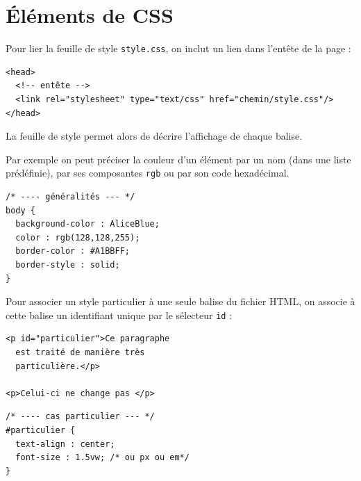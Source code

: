 \section{Éléments de CSS}


Pour lier la feuille de style \texttt{style.css}, on inclut un lien dans l'entête de la page :

\begin{verbatim}
<head>
  <!-- entête -->
  <link rel="stylesheet" type="text/css" href="chemin/style.css"/>
</head>
\end{verbatim}



\begin{multicols}{2}

La feuille de style permet alors de décrire l'affichage de chaque balise.

Par exemple on peut préciser la couleur d'un élément par un nom (dans une liste prédéfinie), par ses composantes \texttt{rgb} ou par son code hexadécimal.

\begin{verbatim}
/* ---- généralités --- */
body {
  background-color : AliceBlue;
  color : rgb(128,128,255);
  border-color : #A1BBFF;
  border-style : solid;
}
\end{verbatim}
\end{multicols}

\medskip

Pour associer un style particulier à une seule balise du fichier HTML, on associe à cette balise un identifiant unique par le sélecteur \texttt{id} :

\begin{multicols}{2}
\begin{verbatim}
<p id="particulier">Ce paragraphe 
  est traité de manière très 
  particulière.</p>
  
<p>Celui-ci ne change pas </p>

\end{verbatim}

\begin{verbatim}
/* ---- cas particulier --- */
#particulier {
  text-align : center;
  font-size : 1.5vw; /* ou px ou em*/
}
\end{verbatim}
\end{multicols}

